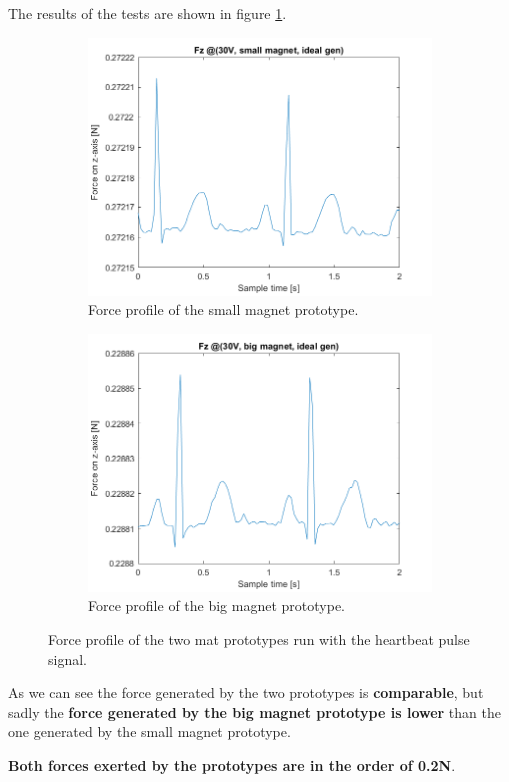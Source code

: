 \begin{samepage}
    The results of the tests are shown in figure \ref{fig: Force_vs_magnet_size}.
    \nopagebreak

    \begin{figure}[H]
        \centering
        \begin{subfigure}[b]{0.475\textwidth}
            \centering
            \includegraphics[width = 1\linewidth]{Chapters/Chapter5/Exp_Evaluation/Figures/Fz_@30V_small_magn_idealgen.png}
            \caption{Force profile of the small magnet prototype.}
        \end{subfigure}
        \begin{subfigure}[b]{0.475\textwidth}
            \centering
            \includegraphics[width = 1\linewidth]{Chapters/Chapter5/Exp_Evaluation/Figures/Fz_@30V_big_magn_idealgen.png}
            \caption{Force profile of the big magnet prototype.}
        \end{subfigure}
        \caption{Force profile of the two mat prototypes run with the heartbeat pulse signal.}
        \label{fig: Force_vs_magnet_size}
    \end{figure}
\end{samepage}


As we can see the force generated by the two prototypes is \textbf{comparable}, but sadly the \textbf{force generated by the big magnet prototype is lower} than the one generated by the small magnet prototype.

\textbf{Both forces exerted by the prototypes are in the order of 0.2N}.